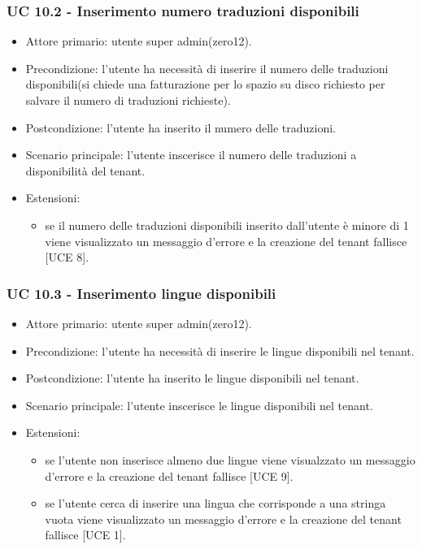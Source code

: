    \subsubsection{UC 10.2 - Inserimento numero traduzioni disponibili}
        \begin{itemize}
            \item Attore primario: utente super admin(zero12).
            \item Precondizione: l'utente ha necessità di inserire il numero delle traduzioni disponibili(si chiede una fatturazione per lo spazio su disco richiesto per salvare il numero di traduzioni richieste).
            \item Postcondizione: l'utente ha inserito il numero delle traduzioni.
            \item Scenario principale: l'utente inscerisce il numero delle traduzioni a disponibilità del tenant.
            \item Estensioni: 
                \begin{itemize}
                    \item se il numero delle traduzioni disponibili inserito dall'utente è minore di 1 viene visualizzato un messaggio d'errore e la creazione del tenant fallisce [UCE 8].
                \end{itemize}
        \end{itemize}
    \subsubsection{UC 10.3 - Inserimento lingue disponibili}
        \begin{itemize}
            \item Attore primario: utente super admin(zero12).
            \item Precondizione: l'utente ha necessità di inserire le lingue disponibili nel tenant.
            \item Postcondizione: l'utente ha inserito le lingue disponibili nel tenant.
            \item Scenario principale: l'utente inscerisce le lingue disponibili nel tenant.
            \item Estensioni: 
                \begin{itemize}
                    \item se l'utente non inserisce almeno due lingue viene visualzzato un messaggio d'errore e la creazione del tenant fallisce [UCE 9].
                    \item se l'utente cerca di inserire una lingua che corrisponde a una stringa vuota viene visualizzato un messaggio d'errore e la creazione del tenant fallisce [UCE 1].
                \end{itemize}
        \end{itemize}
